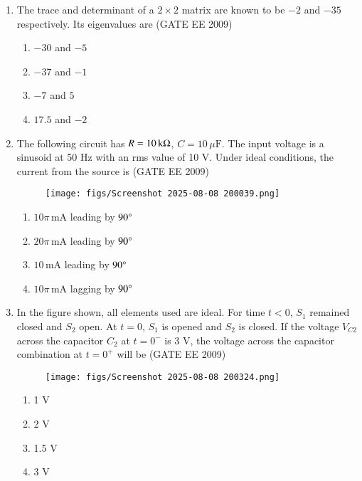 \documentclass[journal,12pt,onecolumn]{IEEEtran}
\theoremstyle{remark}
\begin{document}
\begin{flushleft}
\begin{enumerate}
\item The trace and determinant of a $2 \times 2$ matrix are known to be $-2$ and $-35$ respectively. Its eigenvalues are
\hfill(GATE EE 2009)
\begin{enumerate}
     \item  $-30$ and $-5$
     \item  $-37$ and $-1$
     \item $-7$ and $5$
     \item $17.5$ and $-2$
\end{enumerate}

\item The following circuit has $R = 10\,\text{k} \ohm$, $C = 10\,\mu\text{F}$. The input voltage is a sinusoid at 50 Hz with an rms value of 10 V. Under ideal conditions, the current from the source is
\hfill(GATE EE 2009)
\begin{figure}[h!]
    \texttt{[image: figs/Screenshot 2025-08-08 200039.png]}
    \caption{}
    \label{fig:placeholder}
\end{figure}

\begin{enumerate}
    \item $10 \pi\,\text{mA}$ leading by $90\degree$
    \item $20 \pi\,\text{mA}$ leading by $90\degree$
    \item $10\,\text{mA}$ leading by $90\degree$
    \item $10 \pi\,\text{mA}$ lagging by $90\degree$
\end{enumerate}


\item In the figure shown, all elements used are ideal. For time $t < 0$, $S_1$ remained closed and $S_2$ open. At $t=0$, $S_1$ is opened and $S_2$ is closed. If the voltage $V_{C2}$ across the capacitor $C_2$ at $t=0^{-}$ is 3 V, the voltage across the capacitor combination at $t=0^{+}$ will be
\hfill(GATE EE 2009)
\begin{figure}[h!]
    \centering
    \texttt{[image: figs/Screenshot 2025-08-08 200324.png]}
    \caption{}
    \label{fig:placeholder}
\end{figure}
\begin{enumerate}
    \item 1 V
    \item 2 V
    \item 1.5 V
    \item 3 V
\end{enumerate}


\end{enumerate}
\end{flushleft}
\end{document}
